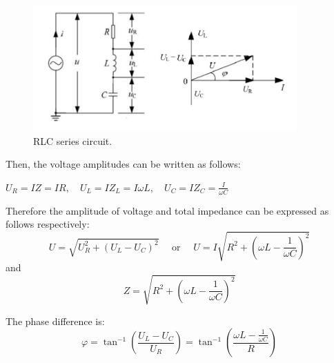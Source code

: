 \documentclass[a4paper,12pt]{article}
\begin{document}
\begin{figure}[htb] 
    \centering
    \includegraphics[width=0.9\textwidth]{Fig4} 
    \caption{RLC series circuit. \cite{labmanual}} 
\end{figure}

Then,  the voltage amplitudes can be written as follows:
\begin{center}
$\displaystyle U_{R}=I Z=I R, \quad U_{L}=I Z_{L}=I \omega L, \quad U_{C}=I Z_{C}=\frac{I}{\omega C}$
\end{center}

Therefore the amplitude of voltage and total impedance can be expressed as follows respectively:
\begin{equation}
U=\sqrt{U_{R}^{2}+\left(U_{L}-U_{C}\right)^{2}} \quad \text { or } \quad U=I \sqrt{R^{2}+\left(\omega L-\frac{1}{\omega C}\right)^{2}}
\end{equation}
and 
\begin{equation}
Z=\sqrt{R^{2}+\left(\omega L-\frac{1}{\omega C}\right)^{2}}
\end{equation}

The phase difference is:
\begin{equation}
\varphi=\tan ^{-1}\left(\frac{U_{L}-U_{C}}{U_{R}}\right)=\tan ^{-1}\left(\frac{\omega L-\frac{1}{\omega C}}{R}\right)
\end{equation}
\end{document}
